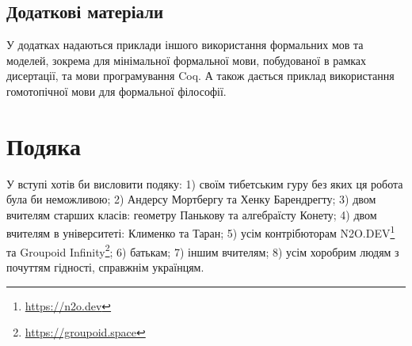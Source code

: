 \subsection*{Додаткові матеріали}
У додатках надаються приклади іншого використання формальних мов та моделей,
зокрема для мінімальної формальної мови, побудованої в рамках дисертації,
та мови програмування Coq. А також дається приклад використання
гомотопічної мови для формальної філософії.

\section{Подяка}
У вступі хотів би висловити подяку:
1) своїм тибетським гуру без яких ця робота була би неможливою;
2) Андерсу Мортбергу та Хенку Барендрегту;
3) двом вчителям старших класів: геометру Панькову та алгебраїсту Конету;
4) двом вчителям в університеті: Клименко та Таран;
5) усім контрібюторам N2O.DEV\footnote{\url{https://n2o.dev}} та Groupoid Infinity\footnote{\url{https://groupoid.space}};
6) батькам;
7) іншим вчителям;
8) усім хоробрим людям з почуттям гідності, справжнім українцям.
